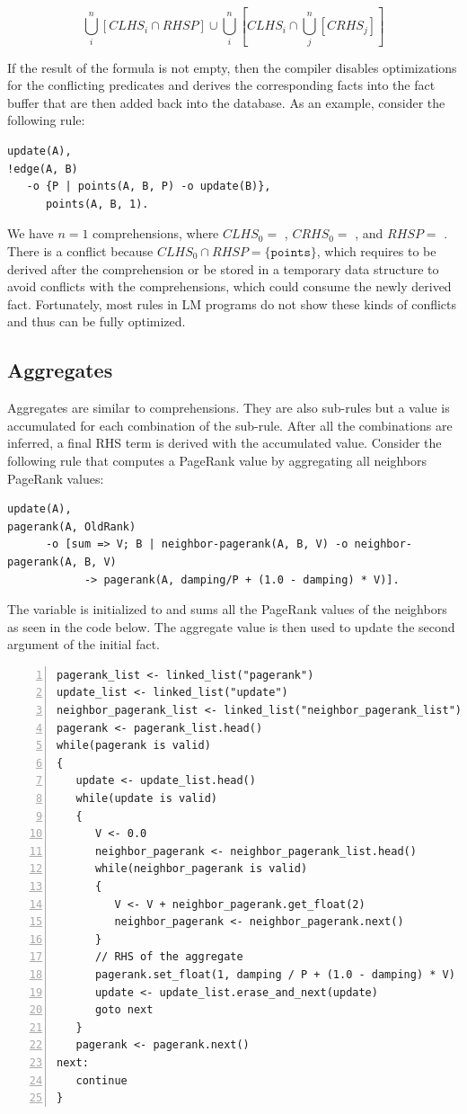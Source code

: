 \[
\bigcup^{n}_i[CLHS_i \cap RHSP] \cup \bigcup^{n}_i [CLHS_i \cap \bigcup^{n}_j[CRHS_j]]
\]

If the result of the formula is not empty, then the compiler disables
optimizations for the conflicting predicates and derives the corresponding facts
into the fact buffer that are then added back into the database. As an example,
consider the following rule:

\begin{Verbatim}[fontsize=\codesize]
update(A),
!edge(A, B)
   -o {P | points(A, B, P) -o update(B)},
      points(A, B, 1).
\end{Verbatim}

We have $n = 1$ comprehensions, where $CLHS_0 = $ ,
$CRHS_0 =$ , and $RHSP = $ . There is a
conflict because $CLHS_0 \cap RHSP = \{\mathtt{points}\}$, which requires
 to be derived after the comprehension or be stored in a
temporary data structure to avoid conflicts with the comprehensions, which could
consume the newly derived fact. Fortunately, most rules in LM programs do not
show these kinds of conflicts and thus can be fully optimized.

\subsection{Aggregates}

Aggregates are similar to comprehensions. They are also sub-rules but a value is
accumulated for each combination of the sub-rule. After all the combinations are
inferred, a final RHS term is derived with the accumulated value. Consider the
following rule that computes a PageRank value by aggregating all neighbors
PageRank values:

\begin{Verbatim}[fontsize=\codesize]
update(A),
pagerank(A, OldRank)
      -o [sum => V; B | neighbor-pagerank(A, B, V) -o neighbor-pagerank(A, B, V)
            -> pagerank(A, damping/P + (1.0 - damping) * V)].
\end{Verbatim}

The variable  is initialized to  and sums all the PageRank
values of the neighbors as seen in the code below. The aggregate value is then
used to update the second argument of the initial  fact.

\begin{Verbatim}[numbers=left,fontsize=\codesize]
pagerank_list <- linked_list("pagerank")
update_list <- linked_list("update")
neighbor_pagerank_list <- linked_list("neighbor_pagerank_list")
pagerank <- pagerank_list.head()
while(pagerank is valid)
{
   update <- update_list.head()
   while(update is valid)
   {
      V <- 0.0
      neighbor_pagerank <- neighbor_pagerank_list.head()
      while(neighbor_pagerank is valid)
      {
         V <- V + neighbor_pagerank.get_float(2)
         neighbor_pagerank <- neighbor_pagerank.next()
      }
      // RHS of the aggregate
      pagerank.set_float(1, damping / P + (1.0 - damping) * V)
      update <- update_list.erase_and_next(update)
      goto next
   }
   pagerank <- pagerank.next()
next:
   continue
}
\end{Verbatim}

